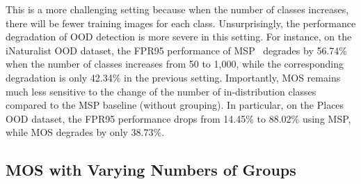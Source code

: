 \documentclass[final]{cvpr}
\begin{document}
This is a more challenging setting because when the number of classes increases, there will be fewer training images for each class. Unsurprisingly, the performance degradation of OOD detection is more severe in this setting. For instance, on the iNaturalist OOD dataset, the FPR95 performance of MSP~\cite{hendrycks2016baseline} degrades by 56.74\% when the number of 
classes increases from 50 to 1,000, while the corresponding degradation is only 42.34\% in the previous setting. Importantly, MOS remains much less sensitive to the change of the number of in-distribution classes compared to the MSP baseline (without grouping). In particular, on the Places OOD dataset, the FPR95 performance drops from 14.45\% to 88.02\% using MSP, while MOS degrades by only 38.73\%. 

\subsection{MOS with Varying Numbers of Groups}
\label{app:group_num_ablation}
\end{document}

